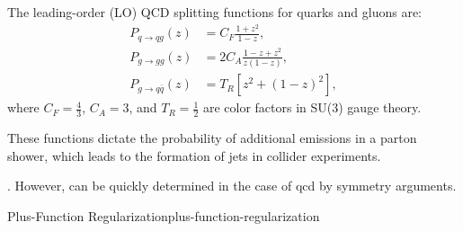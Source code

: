 




\begin{answer}
    The leading-order (LO) QCD splitting functions for quarks and gluons  are:
    \begin{align}
        P_{q \to qg}(z) &= C_F \frac{1+z^2}{1-z}, \\
        P_{g \to gg}(z) &= 2C_A \frac{1 - z + z^2}{z(1-z)}, \\
        P_{g \to q\bar{q}}(z) &= T_R \left[z^2 + (1-z)^2\right],
    \end{align}
    where \( C_F = \frac{4}{3} \), \( C_A = 3 \), and \( T_R = \frac{1}{2} \) are color factors in SU(3) gauge theory.
\end{answer}

These functions dictate the probability of additional emissions in a parton shower, which leads to the formation of jets in collider experiments.

.
%
%
However, can be quickly determined in the case of \gls{qcd} by symmetry arguments.

\begin{example}
\end{example}

\begin{definitionbox}{Plus-Function Regularization}{plus-function-regularization}


\end{definitionbox}




